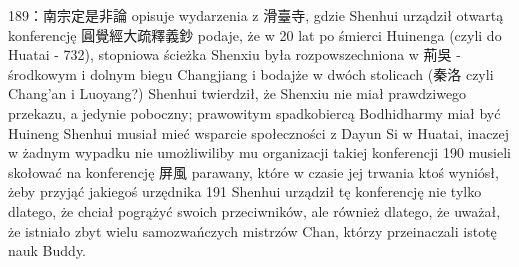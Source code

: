 189：南宗定是非論 opisuje wydarzenia z 滑臺寺, gdzie Shenhui urządził otwartą konferencję
圓覺經大疏釋義鈔 podaje, że w 20 lat po śmierci Huinenga (czyli do Huatai - 732), stopniowa ścieżka Shenxiu była rozpowszechniona w 荊吳 - środkowym i dolnym biegu Changjiang i bodajże w dwóch stolicach (秦洛 czyli Chang'an i Luoyang?)
Shenhui twierdził, że Shenxiu nie miał prawdziwego przekazu, a jedynie poboczny; prawowitym spadkobiercą Bodhidharmy miał być Huineng
Shenhui musiał mieć wsparcie społeczności z Dayun Si w Huatai, inaczej w żadnym wypadku nie umożliwiliby mu organizacji takiej konferencji
190 musieli skołować na konferencję 屏風 parawany, które w czasie jej trwania ktoś wyniósł, żeby przyjąć jakiegoś urzędnika
191 Shenhui urządził tę konferencję nie tylko dlatego, że chciał pogrążyć swoich przeciwników, ale również dlatego, że uważał, że istniało zbyt wielu samozwańczych mistrzów Chan, którzy przeinaczali istotę nauk Buddy.
\fi
